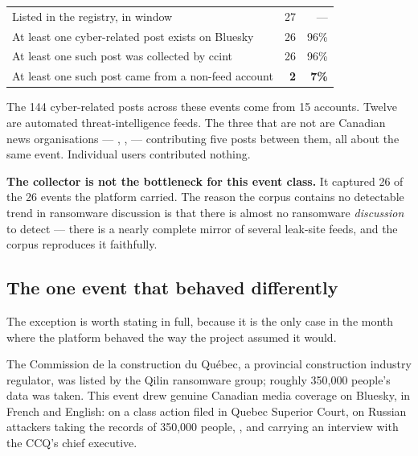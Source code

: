 \documentclass[11pt]{article}
\begin{document}
\begin{center}
\begin{tabularx}{\linewidth}{@{}Lrr@{}}
\toprule
{} &  &  \\
\midrule
Listed in the registry, in window & 27 & --- \\
At least one cyber-related post exists on Bluesky & 26 & 96\% \\
At least one such post was collected by ccint & 26 & 96\% \\
At least one such post came from a non-feed account & \textbf{2} & \textbf{7\%} \\
\bottomrule
\end{tabularx}
\end{center}

\medskip

The 144 cyber-related posts across these events come from 15 accounts. Twelve
are automated threat-intelligence feeds. The three that are not are Canadian
news organisations --- , ,
 --- contributing five posts between them, all about the same
event. Individual users contributed nothing.

\begin{keybox}
\textbf{The collector is not the bottleneck for this event class.} It captured
26 of the 26 events the platform carried. The reason the corpus contains no
detectable trend in ransomware discussion is that there is almost no
ransomware \emph{discussion} to detect --- there is a nearly complete mirror of
several leak-site feeds, and the corpus reproduces it faithfully.
\end{keybox}

\subsection{The one event that behaved differently}

The exception is worth stating in full, because it is the only case in the
month where the platform behaved the way the project assumed it would.

The Commission de la construction du Qu\'ebec, a provincial construction
industry regulator, was listed by the Qilin ransomware group; roughly 350{,}000
people's data was taken. This event drew genuine Canadian media coverage on
Bluesky, in French and English:  on a class action filed
in Quebec Superior Court,  on Russian attackers taking the
records of 350{,}000 people, , and  carrying
an interview with the CCQ's chief executive.
\end{document}
